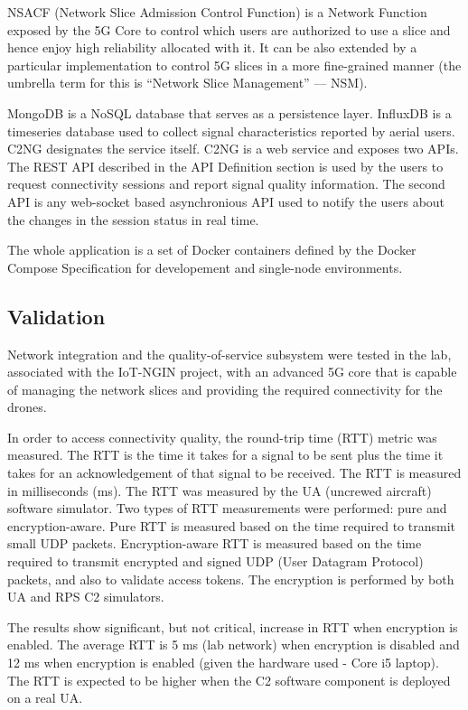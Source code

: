 \documentclass[a4paper,conference]{IEEEtran}
\begin{document}
NSACF (Network Slice Admission Control Function) is a Network Function exposed by the 5G Core to control which users are authorized to use a slice and hence enjoy high reliability allocated with it. It can be also extended by a particular implementation to control 5G slices in a more fine-grained manner (the umbrella term for this is “Network Slice Management” --- NSM).

MongoDB is a NoSQL database that serves as a persistence layer. InfluxDB is a timeseries database used to collect signal characteristics reported by aerial users. C2NG designates the service itself. C2NG is a web service and exposes two APIs. The REST API described in the API Definition section is used by the users to request connectivity sessions and report signal quality information. The second API is any web-socket based asynchronious API used to notify the users about the changes in the session status in real time.

The whole application is a set of Docker containers defined by the Docker Compose Specification for developement and single-node environments.

\subsection{Validation}

Network integration and the quality-of-service subsystem were tested in the lab, associated with the IoT-NGIN project, with an advanced 5G core that is capable of managing the network slices and providing the required connectivity for the drones.

In order to access connectivity quality, the round-trip time (RTT) metric was measured. The RTT is the time it takes for a signal to be sent plus the time it takes for an acknowledgement of that signal to be received. The RTT is measured in milliseconds (ms). The RTT was measured by the UA (uncrewed aircraft) software simulator. Two types of RTT measurements were performed: pure and encryption-aware. Pure RTT is measured based on the time required to transmit small UDP packets. Encryption-aware RTT is measured based on the time required to transmit encrypted and signed UDP (User Datagram Protocol) packets, and also to validate access tokens. The encryption is performed by both UA and RPS C2 simulators.

The results show significant, but not critical, increase in RTT when encryption is enabled. The average RTT is 5 ms (lab network) when encryption is disabled and 12 ms when encryption is enabled (given the hardware used - Core i5 laptop). The RTT is expected to be higher when the C2 software component is deployed on a real UA.
\end{document}
